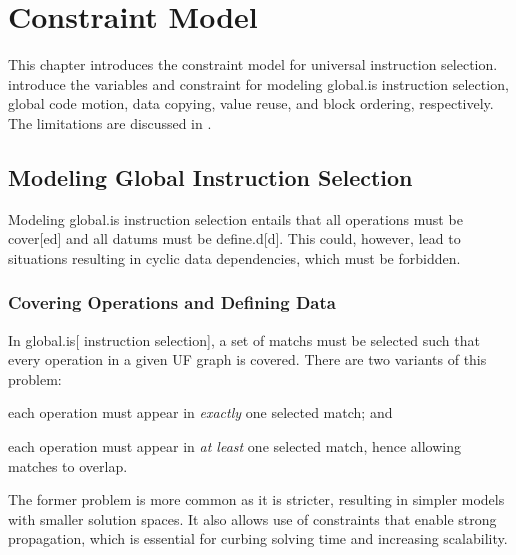 %

\chapter{Constraint Model}

This chapter introduces the \gls{constraint model} for \gls{universal
  instruction selection}.
%
introduce the \glspl{variable} and \gls{constraint} for modeling \gls{global.is}
\gls{instruction selection}, \gls{global code motion}, \gls{data copying},
\gls{value reuse}, and \gls{block ordering}, respectively.
%
The  limitations are discussed in
.



\section{Modeling Global Instruction Selection}

Modeling \gls{global.is} \gls{instruction selection} entails that all
\glspl{operation} must be \gls{cover}[ed] and all \glspl{datum} must be
\gls{define.d}[d].
%
This could, however, lead to situations resulting in cyclic data dependencies,
which must be forbidden.


\subsection{Covering Operations and Defining Data}

In \gls{global.is}[ \gls{instruction selection}], a set of \glspl{match} must be
selected such that every \gls{operation} in a given \gls{UF graph} is covered.
%
There are two variants of this problem:
%
\begin{enumerate*}[label=(\arabic*)]
  \item each \gls{operation} must appear in \emph{exactly} one selected
    \gls{match}; and
%
  \item each \gls{operation} must appear in \emph{at least} one selected
    \gls{match}, hence allowing matches to \gls{overlap}.
\end{enumerate*}
%
The former problem is more common as it is stricter, resulting in simpler models
with smaller \glspl{solution space}.
%
It also allows use of \glspl{constraint} that enable strong \gls{propagation},
which is essential for curbing solving time and increasing scalability.

